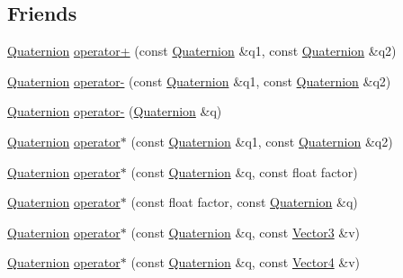 \subsection*{Friends}
\begin{DoxyCompactItemize}
\item 
\hyperlink{classprism_1_1geometry_1_1_quaternion}{Quaternion} \hyperlink{classprism_1_1geometry_1_1_quaternion_a55c89dc55cca66b19679705c566a165a}{operator+} (const \hyperlink{classprism_1_1geometry_1_1_quaternion}{Quaternion} \&q1, const \hyperlink{classprism_1_1geometry_1_1_quaternion}{Quaternion} \&q2)
\item 
\hyperlink{classprism_1_1geometry_1_1_quaternion}{Quaternion} \hyperlink{classprism_1_1geometry_1_1_quaternion_a3a5605ba3f0bb654c528d2f7beb34147}{operator-\/} (const \hyperlink{classprism_1_1geometry_1_1_quaternion}{Quaternion} \&q1, const \hyperlink{classprism_1_1geometry_1_1_quaternion}{Quaternion} \&q2)
\item 
\hyperlink{classprism_1_1geometry_1_1_quaternion}{Quaternion} \hyperlink{classprism_1_1geometry_1_1_quaternion_a82faed3b53a20e9c2acf7fa2406263c8}{operator-\/} (\hyperlink{classprism_1_1geometry_1_1_quaternion}{Quaternion} \&q)
\item 
\hyperlink{classprism_1_1geometry_1_1_quaternion}{Quaternion} \hyperlink{classprism_1_1geometry_1_1_quaternion_a02f988d3aef50bac26fc6fed8429d6a2}{operator$\ast$} (const \hyperlink{classprism_1_1geometry_1_1_quaternion}{Quaternion} \&q1, const \hyperlink{classprism_1_1geometry_1_1_quaternion}{Quaternion} \&q2)
\item 
\hyperlink{classprism_1_1geometry_1_1_quaternion}{Quaternion} \hyperlink{classprism_1_1geometry_1_1_quaternion_a7a69f073f287d3e5e614995aa588dfba}{operator$\ast$} (const \hyperlink{classprism_1_1geometry_1_1_quaternion}{Quaternion} \&q, const float factor)
\item 
\hyperlink{classprism_1_1geometry_1_1_quaternion}{Quaternion} \hyperlink{classprism_1_1geometry_1_1_quaternion_a103d9036740a77394440b39eb4bf3c0b}{operator$\ast$} (const float factor, const \hyperlink{classprism_1_1geometry_1_1_quaternion}{Quaternion} \&q)
\item 
\hyperlink{classprism_1_1geometry_1_1_quaternion}{Quaternion} \hyperlink{classprism_1_1geometry_1_1_quaternion_a3ae869a94a277b595456e7a0d8cf0730}{operator$\ast$} (const \hyperlink{classprism_1_1geometry_1_1_quaternion}{Quaternion} \&q, const \hyperlink{classprism_1_1geometry_1_1_vector3}{Vector3} \&v)
\item 
\hyperlink{classprism_1_1geometry_1_1_quaternion}{Quaternion} \hyperlink{classprism_1_1geometry_1_1_quaternion_a9156a92837fec8bf13994dddc21afacf}{operator$\ast$} (const \hyperlink{classprism_1_1geometry_1_1_quaternion}{Quaternion} \&q, const \hyperlink{classprism_1_1geometry_1_1_vector4}{Vector4} \&v)

\end{DoxyCompactItemize}
